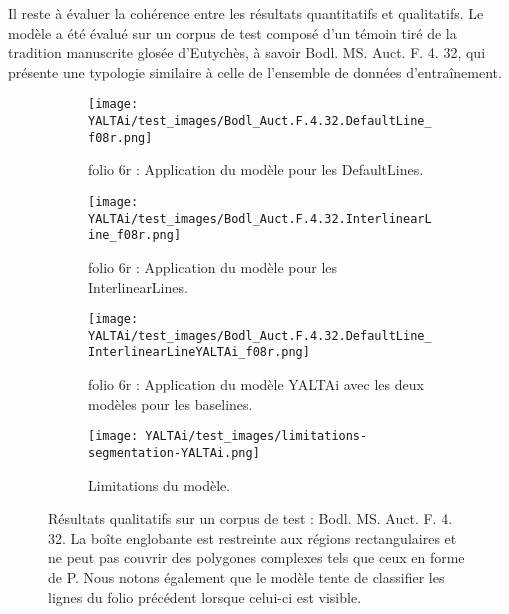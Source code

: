 \documentclass[a4paper, twoside, 12pt]{book}
\begin{document}
Il reste à évaluer la cohérence entre les résultats quantitatifs et qualitatifs. Le modèle a été évalué sur un corpus de test composé d'un témoin tiré de la tradition manuscrite glosée d'Eutychès, à savoir Bodl. MS. Auct. F. 4. 32,  qui présente une typologie similaire à celle de l'ensemble de données d'entraînement.

\begin{figure}[H]
  \centering
  \begin{subfigure}{0.5\textwidth}
    \centering
    \texttt{[image: YALTAi/test\_images/Bodl\_Auct.F.4.32.DefaultLine\_f08r.png]}
    \caption{folio 6r : Application du modèle pour les DefaultLines.}
  \end{subfigure}
  \hspace{1cm} %
  \begin{subfigure}{0.4\textwidth}
    \centering
    \texttt{[image: YALTAi/test\_images/Bodl\_Auct.F.4.32.InterlinearLine\_f08r.png]}
    \caption{folio 6r : Application du modèle pour les InterlinearLines.}
  \end{subfigure}
  
  \vspace{0.5cm} %
  
  \begin{subfigure}{0.5\textwidth}
    \centering
    \texttt{[image: YALTAi/test\_images/Bodl\_Auct.F.4.32.DefaultLine\_InterlinearLineYALTAi\_f08r.png]}
    \caption{folio 6r : Application du modèle YALTAi avec les deux modèles pour les baselines.}
  \end{subfigure}
  \hspace{1cm} %
  \begin{subfigure}{0.4\textwidth}
    \centering
    \texttt{[image: YALTAi/test\_images/limitations-segmentation-YALTAi.png]}
    \caption{Limitations du modèle.}
  \end{subfigure}
  \caption{Résultats qualitatifs sur un corpus de test : Bodl. MS. Auct. F. 4. 32. La boîte englobante est restreinte aux régions rectangulaires et ne peut pas couvrir des polygones complexes tels que ceux en forme de P. Nous notons également que le modèle tente de classifier les lignes du folio précédent lorsque celui-ci est visible.}
  \label{fig:qualitative_YALTAi-kraken}
\end{figure}
\end{document}
